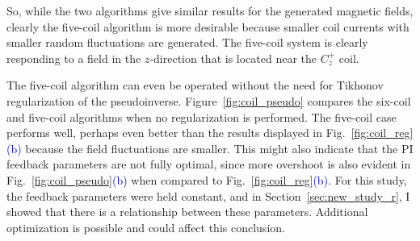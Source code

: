 So, while the two algorithms give similar results for the generated
magnetic fields, clearly the five-coil algorithm is more desirable
because smaller coil currents with smaller random fluctuations are
generated.  The five-coil system is clearly responding to a field in
the $z$-direction that is located near the $C_z^+$ coil.



The five-coil algorithm can even be operated without the need for
Tikhonov regularization of the pseudoinverse.
Figure~\ref{fig:coil_pseudo} compares the six-coil and five-coil
algorithms when no regularization is performed.  The five-coil case
performs well, perhaps even better than the results displayed in
Fig.~\ref{fig:coil_reg}\textcolor{blue}{(b)} because the field
fluctuations are smaller.  This might also indicate that the PI
feedback parameters are not fully optimal, since more overshoot is
also evident in Fig.~\ref{fig:coil_pseudo}\textcolor{blue}{(b)} when
compared to Fig.~\ref{fig:coil_reg}\textcolor{blue}{(b)}.  For this
study, the feedback parameters were held constant, and in
Section~\ref{sec:new_study_r}, I showed that there is a relationship
between these parameters.  Additional optimization is possible and
could affect this conclusion.

